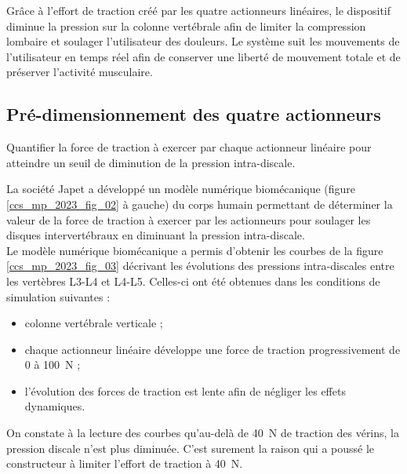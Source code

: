 Grâce à l'effort de traction créé par les quatre actionneurs linéaires, le dispositif diminue la pression sur la colonne vertébrale afin de limiter la compression lombaire et soulager l'utilisateur des douleurs. Le système suit les mouvements de l'utilisateur en temps réel afin de conserver une liberté de mouvement totale et de préserver l'activité musculaire.

\subsection{Pré-dimensionnement des quatre actionneurs} %
\begin{obj}
Quantifier la force de traction à exercer par chaque actionneur linéaire pour atteindre un seuil de diminution de la pression intra-discale.
\end{obj}

La société Japet a développé un modèle numérique biomécanique (figure \ref{ccs_mp_2023_fig_02} à gauche) du corps humain permettant de déterminer la valeur de la force de traction à exercer par les actionneurs pour soulager les disques intervertébraux en diminuant la pression intra-discale.\\
Le modèle numérique biomécanique a permis d'obtenir les courbes de la figure \ref{ccs_mp_2023_fig_03} décrivant les évolutions des pressions intra-discales entre les vertèbres L3-L4 et L4-L5. Celles-ci ont été obtenues dans les conditions de simulation suivantes :

\begin{itemize}
  \item colonne vertébrale verticale ;
  \item chaque actionneur linéaire développe une force de traction progressivement de 0 à \SI{100}{N} ;
  \item l'évolution des forces de traction est lente afin de négliger les effets dynamiques.
\end{itemize}

\ifprof
\begin{corrige}
On constate à la lecture des courbes qu'au-delà de \SI{40}{N} de traction des vérins, la pression discale n'est plus diminuée. C'est surement la raison qui a poussé le constructeur à limiter l'effort de traction à \SI{40}{N}.
\end{corrige}
\else
\fi

